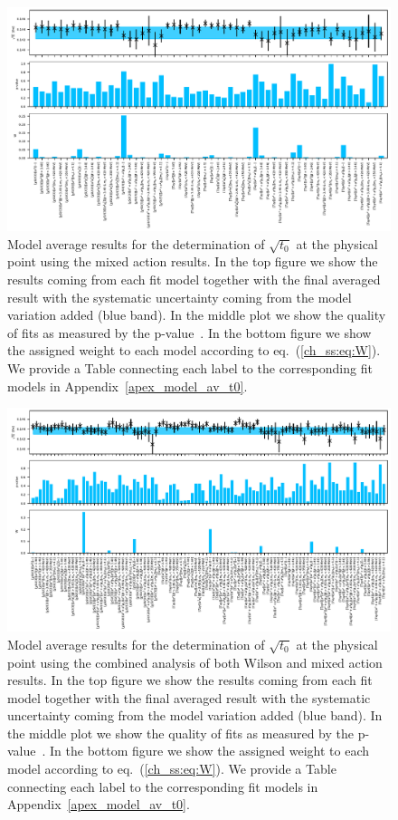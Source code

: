 \begin{figure}
    \centering
    \includegraphics[width=1.\textwidth]{./cap5/figs/BMA_tm.pdf}
    \caption{Model average results for the determination of $\sqrt{t_0}$ at the physical point using the mixed action results. In the top figure we show the results coming from each fit model together with the final averaged result with the systematic uncertainty coming from the model variation added (blue band). In the middle plot we show the quality of fits as measured by the p-value~\cite{chi_exp}. In the bottom figure we show the assigned weight to each model according to eq.~(\ref{ch_ss:eq:W}). We provide a Table connecting each label to the corresponding fit models in Appendix~\ref{apex_model_av_t0}.}
    \label{ch_ss:fig:BMA_tm}
\end{figure}

\begin{figure}
    \centering
    \includegraphics[width=1.\textwidth]{./cap5/figs/BMA_comb.pdf}
    \caption{Model average results for the determination of $\sqrt{t_0}$ at the physical point using the combined analysis of both Wilson and mixed action results. In the top figure we show the results coming from each fit model together with the final averaged result with the systematic uncertainty coming from the model variation added (blue band). In the middle plot we show the quality of fits as measured by the p-value~\cite{chi_exp}. In the bottom figure we show the assigned weight to each model according to eq.~(\ref{ch_ss:eq:W}). We provide a Table connecting each label to the corresponding fit models in Appendix~\ref{apex_model_av_t0}.}
    \label{ch_ss:fig:BMA_comb}
\end{figure}

